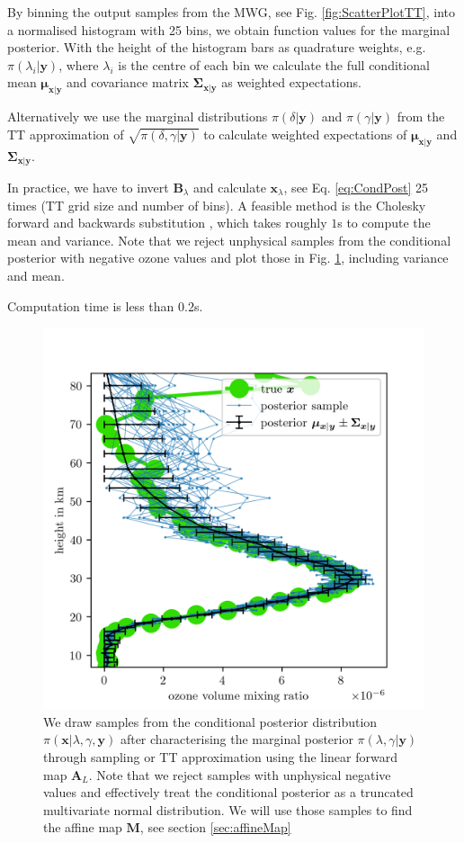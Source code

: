 By binning the output samples from the MWG, see Fig. \ref{fig:ScatterPlotTT}, into a normalised histogram with 25 bins, we obtain function values for the marginal posterior.
With the height of the histogram bars as quadrature weights, e.g. $\pi(\lambda_i| \bm{y})$, where $\lambda_i$ is the centre of each bin we calculate the full conditional mean $\bm{\mu}_{\bm{x}|\bm{y}}$ and covariance matrix $\bm{\Sigma}_{\bm{x}|\bm{y}}$ as weighted expectations.

Alternatively we use the marginal distributions $\pi(\delta | \bm{y})$ and $\pi(\gamma | \bm{y})$ from the TT approximation of $\sqrt{\pi(\delta, \gamma | \bm{y})}$ to calculate 
weighted expectations of $\bm{\mu}_{\bm{x}|\bm{y}}$ and $\bm{\Sigma}_{\bm{x}|\bm{y}}$.

In practice, we have to invert $\bm{B}_{\lambda} $ and calculate $\bm{x}_{\lambda}$, see Eq. \ref{eq:CondPost} 25 times (TT grid size and number of bins).
A feasible method is the Cholesky forward and backwards substitution \cite{}, which takes roughly $1$s to compute the mean and variance.
Note that we reject unphysical samples from the conditional posterior with negative ozone values and plot those in Fig. \ref{fig:O3Samp}, including variance and mean.

Computation time is less than $0.2$s.
\begin{figure}[ht!]
	\centering
	\includegraphics{FirstTestRes.png}
	\caption[Ozone samples of the conditional posterior.]{We draw samples from the conditional posterior distribution  $\pi(\bm{x}|\lambda,\gamma , \bm{y})$ after characterising the marginal posterior $\pi(\lambda,\gamma | \bm{y})$ through sampling or TT approximation using the linear forward map $\bm{A}_L$. Note that we reject samples with unphysical negative values and effectively treat the conditional posterior as a truncated multivariate normal distribution. We will use those samples to find the affine map $\bm{M}$, see section \ref{sec:affineMap}}
	\label{fig:O3Samp}
\end{figure}

